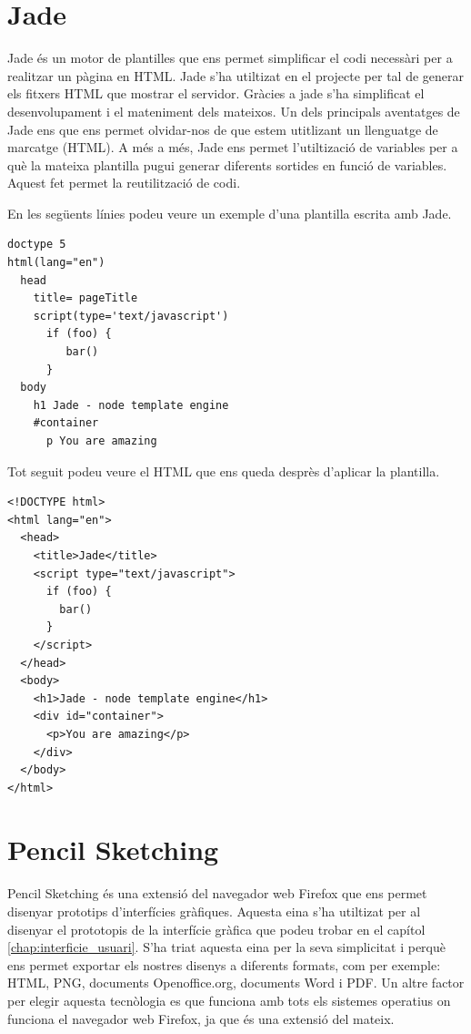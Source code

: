\section{Jade}

Jade és un motor de plantilles que ens permet simplificar el codi necessàri per a realitzar un pàgina en HTML. Jade s'ha utiltizat en el projecte per tal de generar els fitxers HTML que mostrar el servidor. Gràcies a jade s'ha simplificat el desenvolupament i el mateniment dels mateixos. Un dels principals aventatges de Jade ens que ens permet olvidar-nos de que estem utitlizant un llenguatge de marcatge (HTML). A més a més, Jade ens permet l'utiltizació de variables per a què la mateixa plantilla pugui generar diferents sortides en funció de variables. Aquest fet permet la reutilització de codi.

En les següents línies podeu veure un exemple d'una plantilla escrita amb Jade. 

\begin{lstlisting}
doctype 5
html(lang="en")
  head
    title= pageTitle
    script(type='text/javascript')
      if (foo) {
         bar()
      }
  body
    h1 Jade - node template engine
    #container
      p You are amazing
\end{lstlisting}

Tot seguit podeu veure el HTML que ens queda desprès d'aplicar la plantilla. 

\begin{lstlisting}
<!DOCTYPE html>
<html lang="en">
  <head>
    <title>Jade</title>
    <script type="text/javascript">
      if (foo) {
      	bar()
      }
    </script>
  </head>
  <body>
    <h1>Jade - node template engine</h1>
    <div id="container">
      <p>You are amazing</p>
    </div>
  </body>
</html>	
\end{lstlisting}

\section{Pencil Sketching}
\label{sec:pencil sketcing}
Pencil Sketching és una extensió del navegador web Firefox que ens permet disenyar prototips d'interfícies gràfiques. Aquesta eina s'ha utiltizat per al disenyar el prototopis de la interfície gràfica que podeu trobar en el capítol \ref{chap:interficie_usuari}. S'ha triat aquesta eina per la seva simplicitat i perquè ens permet exportar els nostres disenys a diferents formats, com per exemple: HTML, PNG, documents Openoffice.org, documents Word i PDF. Un altre factor per elegir aquesta tecnòlogia es que funciona amb tots els sistemes operatius on funciona el navegador web Firefox, ja que és una extensió del mateix.

